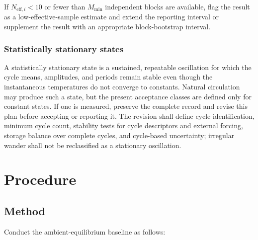 \documentclass[11pt]{article}
\begin{document}
If $N_{\mathrm{eff},i}<10$ or fewer than $M_{\min}$ independent blocks are available, flag the result as a low-effective-sample estimate and extend the reporting interval or supplement the result with an appropriate block-bootstrap interval.

\subsubsection{Statistically stationary states}
\label{sec:stationary_state}

A statistically stationary state is a sustained, repeatable oscillation for which the cycle means, amplitudes, and periods remain stable even though the instantaneous temperatures do not converge to constants. Natural circulation may produce such a state, but the present acceptance classes are defined only for constant states. If one is measured, preserve the complete record and revise this plan before accepting or reporting it. The revision shall define cycle identification, minimum cycle count, stability tests for cycle descriptors and external forcing, storage balance over complete cycles, and cycle-based uncertainty; irregular wander shall not be reclassified as a stationary oscillation.



\clearpage
\section{Procedure}
\label{sec:procedure}
\label{sec:test_procedure}
\label{sec:baseline}
\subsection{Method}

Conduct the ambient-equilibrium baseline as follows:
\end{document}
